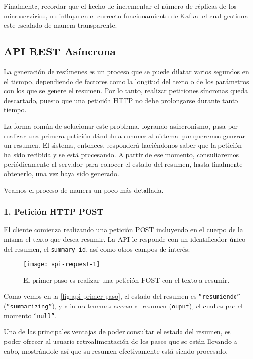 Finalmente, recordar que el hecho de incrementar el número de réplicas de los microservicios, no influye en el correcto funcionamiento de Kafka, el cual gestiona este escalado de manera transparente.

\subsection{API REST Asíncrona}

La generación de resúmenes es un proceso que se puede dilatar varios segundos en el tiempo, dependiendo de factores como la longitud del texto o de los parámetros con los que se genere el resumen. Por lo tanto, realizar peticiones síncronas queda descartado, puesto que una petición HTTP no debe prolongarse durante tanto tiempo.

La forma común de solucionar este problema, logrando asincronismo, pasa por realizar una primera petición dándole a conocer al sistema que queremos generar un resumen. El sistema, entonces, responderá haciéndonos saber que la petición ha sido recibida y se está procesando. A partir de ese momento, consultaremos periódicamente al servidor para conocer el estado del resumen, hasta finalmente obtenerlo, una vez haya sido generado.

Veamos el proceso de manera un poco más detallada.

\subsubsection{1. Petición HTTP POST}

El cliente comienza realizando una petición POST incluyendo en el cuerpo de la misma el texto que desea resumir. La API le responde con un identificador único del resumen, el \texttt{summary\_id}, así como otros campos de interés:

\begin{figure}[h]
	\centering
	\texttt{[image: api-request-1]}
	\caption[Primer paso: realizar una petición POST.]{El primer paso es realizar una petición POST con el texto a resumir.}
	\label{fig:api-primer-paso}
\end{figure}

Como vemos en la \autoref{fig:api-primer-paso}, el estado del resumen es \texttt{``resumiendo''} (\texttt{``summarizing''}), y aún no tenemos acceso al resumen (\texttt{ouput}), el cual es por el momento \texttt{``null''}.

Una de las principales ventajas de poder consultar el estado del resumen, es poder ofrecer al usuario retroalimentación de los pasos que se están llevando a cabo, mostrándole así que su resumen efectivamente está siendo procesado.

